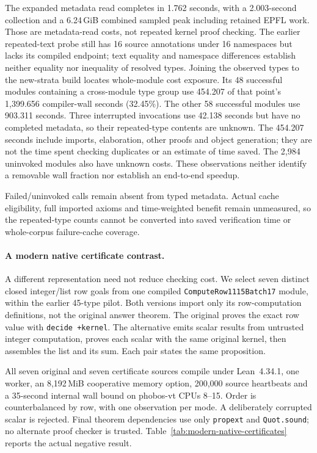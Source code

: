 \documentclass[10pt,twocolumn]{article}
\begin{document}
The expanded metadata read completes in 1.762 seconds, with a 2.003-second
collection and a 6.24\,GiB combined sampled peak including retained EPFL work.
Those are metadata-read costs, not repeated kernel proof checking.
The earlier repeated-text probe still has 16 source annotations under
16 namespaces but lacks its compiled endpoint; text equality and namespace
differences establish neither equality nor inequality of resolved types.
Joining the observed types to the new-strata build locates whole-module
cost exposure. Its 48 successful modules containing a cross-module type group
use 454.207 of that point's 1,399.656 compiler-wall seconds (32.45\%).
The other 58 successful modules use 903.311 seconds. Three interrupted
invocations use 42.138 seconds but have no completed metadata, so their
repeated-type contents are unknown. The 454.207 seconds include imports,
elaboration, other proofs and object generation; they are not the time
spent checking duplicates or an estimate of time saved. The 2,984 uninvoked
modules also have unknown costs. These observations neither identify a
removable wall fraction nor establish an end-to-end speedup.

Failed/uninvoked calls remain absent from typed metadata.
Actual cache eligibility, full imported
axioms and time-weighted benefit remain unmeasured, so the repeated-type counts
cannot be converted into saved verification time or whole-corpus failure-cache
coverage.

\paragraph{A modern native certificate contrast.}
A different representation need not reduce checking cost. We select seven
distinct closed integer/list row goals from one compiled
\texttt{ComputeRow1115Batch17} module, within the earlier 45-type pilot.
Both versions import only its row-computation definitions, not the original
answer theorem. The original proves the exact row value with
\texttt{decide +kernel}. The alternative emits scalar results from untrusted
integer computation, proves each scalar with the same original kernel,
then assembles the list and its sum. Each pair states the same proposition.

All seven original and seven certificate sources compile under Lean~4.34.1,
one worker, an 8,192\,MiB cooperative memory option, 200,000 source heartbeats
and a 35-second internal wall bound on phobos-vt CPUs 8--15.
Order is counterbalanced by row, with one observation per mode.
A deliberately corrupted scalar is rejected. Final theorem dependencies
use only \texttt{propext} and \texttt{Quot.sound}; no alternate proof checker
is trusted. Table~\ref{tab:modern-native-certificates} reports the actual
negative result.
\end{document}
